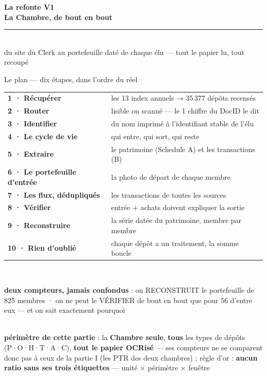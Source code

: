 \documentclass[11pt,aspectratio=169]{beamer}
\newcommand{\chapdivider}[3]{%
  \begin{frame}[plain]
    \centering\vfill
    {\color{helec!85}\large\textbf{#1}}\\[3.5mm]
    {\color{black!88}\fontsize{29}{33}\selectfont\textbf{#2}}\\[4mm]
    {\color{helec!45}\rule{0.30\textwidth}{1.2pt}}\\[4mm]
    {\color{black!55}\large #3}
    \vfill
  \end{frame}}
\begin{document}
\chapdivider{La refonte V1}{La Chambre, de bout en bout}{du site du Clerk au portefeuille daté de chaque élu — tout le papier lu, tout recoupé}

\begin{frame}{Le plan — dix étapes, dans l'ordre du réel}
  \centering
  {\footnotesize\setlength{\tabcolsep}{5pt}\renewcommand{\arraystretch}{1.1}
  \begin{tabular}{l l}
    \textbf{1 · Récupérer} & les 13 index annuels → 35\,377 dépôts recensés \\
    \textbf{2 · Router} & lisible ou scanné — le 1\ier{} chiffre du DocID le dit \\
    \textbf{3 · Identifier} & du nom imprimé à l'identifiant stable de l'élu \\
    \textbf{4 · Le cycle de vie} & qui entre, qui sort, qui reste \\
    \textbf{5 · Extraire} & le patrimoine (Schedule A) et les transactions (B) \\
    \textbf{6 · Le portefeuille d'entrée} & la photo de départ de chaque membre \\
    \textbf{7 · Les flux, dédupliqués} & les transactions de toutes les sources \\
    \textbf{8 · Vérifier} & entrée + achats doivent expliquer la sortie \\
    \textbf{9 · Reconstruire} & la série datée du patrimoine, membre par membre \\
    \textbf{10 · Rien d'oublié} & chaque dépôt a un traitement, la somme boucle \\
  \end{tabular}}\\[3mm]
  \colorbox{helec}{\parbox{0.92\textwidth}{\footnotesize\color{white}\centering
    \textbf{deux compteurs, jamais confondus} : on RECONSTRUIT le portefeuille de
    825 membres · on ne peut le VÉRIFIER de bout en bout que pour
    56 d'entre eux — et on sait exactement pourquoi}}\\[2.5mm]
  {\scriptsize\color{black!60} \textbf{périmètre de cette partie} : la \textbf{Chambre seule},
   \textbf{tous} les types de dépôts (P·O·H·T·A·C), \textbf{tout le papier OCRisé} — ses
   compteurs ne se comparent donc pas à ceux de la partie I (les PTR des deux chambres) ;
   règle d'or : \textbf{aucun ratio sans ses trois étiquettes} — unité × périmètre × fenêtre}
\end{frame}
\end{document}
